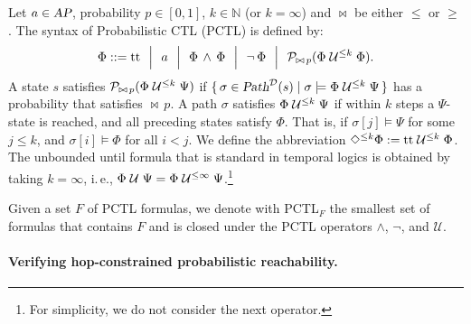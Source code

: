 \documentclass{llncs}
\begin{document}
        Let $a \in \mbox{\sl AP}$,
        probability $p \in [0,1]$,
        $k \in \mathbb{N}$ (or $k = \infty$)
        and $\bowtie$ be either $\leq$ or $\geq$.
        The syntax of Probabilistic CTL (PCTL) \cite{HanssonJ_FAC94} is defined by:
	\vspace{-1pt}
        \[ \Phi ::= \mathrm{tt} \ \ \Big|  \ \ a \ \ \Big| 
              \ \ \Phi \, \wedge \, \Phi  \ \ \Big| 
              \ \ \neg \, \Phi \ \ \Big| 
              \ \ \mathcal{P}_{\bowtie \, p}(\Phi \mathrel{\mathcal{U}^{\leq k}} \Phi) .
        \]
	\vspace{-1pt}
        A state $s$ satisfies $\mathcal{P}_{\bowtie \, p}(\Phi \mathrel{\mathcal{U}^{\leq k}} \Psi)$
        if $\{ \,  \sigma \in \mbox{\sl Path}^{\mathcal{D}}(s) \mid \sigma \models \Phi \mathrel{\mathcal{U}^{\leq k}} \Psi \, \}$ 
        has a probability that satisfies $\bowtie \, p$.
        A path $\sigma$ satisfies $\Phi \mathrel{\mathcal{U}^{\leq k}} \Psi$
        if within $k$ steps a $\Psi$-state is reached,
        and all preceding states satisfy $\Phi$.
        That is, if $\sigma[j] \models \Psi$ for some $j \leq k$,
        and $\sigma[i] \models \Phi$ for all $i < j$.
	We define the abbreviation $\Diamond^{\leq k} \Phi := \mathrm{tt} \mathrel{\mathcal{U}^{\leq k}} \Phi$.
        The unbounded until formula that is standard in temporal logics
        is obtained by taking $k = \infty$,
        i.\,e.\@, $\Phi \mathrel{\mathcal{U}} \Psi = \Phi \mathrel{\mathcal{U}^{\leq \infty}} \Psi$.\footnote{For
                simplicity, we do not consider the next operator.}

        Given a set $F$ of PCTL formulas,
        we denote with PCTL$_F$ the smallest set of formulas
        that contains $F$ and is closed under the PCTL operators $\wedge$, $\neg$, and $\mathcal{U}$.

\paragraph{Verifying hop-constrained probabilistic reachability.}
\end{document}

